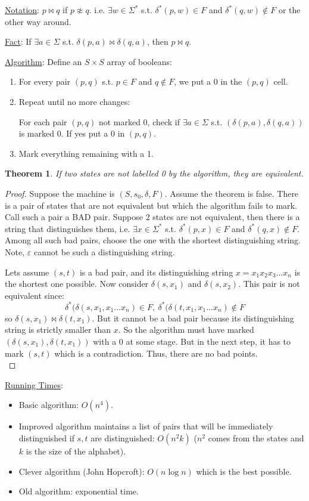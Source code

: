 \documentclass{article}
\newtheorem{theorem}{Theorem}
\begin{document}
\bigbreak\noindent \underline{Notation}: $p \bowtie q$ if $p \not\approx q$. i.e. $\exists w \in \Sigma^*$ s.t. $\delta^*(p,w) \in F$ and $\delta^*(q,w) \notin F$ or the other way around.

\bigbreak\noindent \underline{Fact}: If $\exists a \in \Sigma$ s.t. $\delta(p,a) \bowtie \delta(q,a)$, then $p \bowtie q$.

\bigbreak\noindent\underline{Algorithm}: Define an $S \times S$ array of booleans:
\begin{enumerate}
    \item For every pair $(p,q)$ s.t. $p \in F$ and $q \notin F$, we put a 0 in the $(p,q)$ cell.
    \item Repeat until no more changes:
    
    For each pair $(p,q)$ not marked 0, check if $\exists a \in \Sigma$ s.t. $(\delta(p,a), \delta(q,a))$ is marked 0. If yes put a 0 in $(p,q)$.
    \item Mark everything remaining with a 1.
\end{enumerate}
\begin{theorem}
If two states are not labelled 0 by the algorithm, they are equivalent.
\end{theorem}
\begin{proof}
Suppose the machine is $(S, s_0, \delta, F)$. Assume the theorem is false. There is a pair of states that are not equivalent but which the algorithm fails to mark. Call such a pair a BAD pair. Suppose 2 states are not equivalent, then there is a string that distinguishes them, i.e. $\exists x \in \Sigma^*$ s.t. $\delta^*(p,x) \in F$ and $\delta^*(q,x) \notin F$. Among all such bad pairs, choose the one with the shortest distinguishing string. Note, $\varepsilon$ cannot be such a distinguishing string.

Lets assume $(s,t)$ is a bad pair, and its distinguishing string $x = x_1x_2x_3\ldots x_n$ is the shortest one possible. Now consider $\delta(s,x_1)$ and $\delta(s,x_2)$. This pair is not equivalent since:
\[\delta^*(\delta(s,x_1,x_1\ldots x_n) \in F,\ \delta^*(\delta(t,x_1,x_1\ldots x_n) \notin F\]
so $\delta(s,x_1) \bowtie \delta(t,x_1)$. But it cannot be a bad pair because its distinguishing string is strictly smaller than $x$. So the algorithm must have marked $(\delta(s,x_1), \delta(t,x_1))$ with a 0 at some stage. But in the next step, it has to mark $(s,t)$ which is a contradiction. Thus, there are no bad points.\\
\end{proof}
\noindent\underline{Running Times}:
\begin{itemize}
    \item Basic algorithm: $O(n^4)$.
    \item Improved algorithm maintains a list of pairs that will be immediately distinguished if $s,t$ are distinguished: $O(n^2k)$ ($n^2$ comes from the states and $k$ is the size of the alphabet).
    \item Clever algorithm (John Hopcroft):  $O(n\log n)$ which is the best possible.
    \item Old algorithm: exponential time.
\end{itemize}
\end{document}
